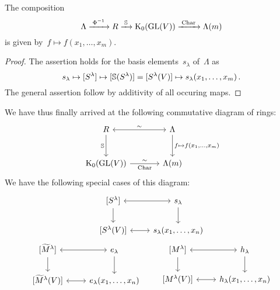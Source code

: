 \documentclass[a4paper,10pt]{scrartcl}
\begin{document}
\begin{corollary}
  The composition
  \[
    \Lambda
    \xrightarrow{\;\Phi^{-1}\;}
    R
    \xrightarrow{\;\mathbb{S}\;}
    \operatorname{K}_0(\operatorname{GL}(V))
    \xrightarrow{\;\operatorname{Char}\;}
    \Lambda(m)
  \]
  is given by~$f \mapsto f(x_1, \dotsc, x_m)$.
\end{corollary}

\begin{proof}
  The assertion holds for the basis elements~$s_\lambda$ of~$\Lambda$ as
  \[
    s_\lambda
    \mapsto
    [S^\lambda]
    \mapsto
    [\mathbb{S}(S^\lambda)]
    =
    [S^\lambda(V)]
    \mapsto
    s_\lambda(x_1, \dotsc, x_m) \,.
  \]
  The general assertion follow by additivity of all occuring maps.
\end{proof}

We have thus finally arrived at the following commutative diagram of rings:
\[
  \begin{tikzcd}[sep = large]
    R
    \arrow[leftrightarrow]{r}{\sim}
    \arrow{d}[left]{\Schur}
    &
    \Lambda
    \arrow{d}[right]{f \mapsto f(x_1, \dotsc, x_m)}
    \\
    \K_0(\GL(V))
    \arrow{r}[above]{\sim}[below]{\Char}
    &
    \Lambda(m)
  \end{tikzcd}
\]
We have the following special cases of this diagram:
\begin{gather*}
  \begin{tikzcd}[ampersand replacement = \&]
    {[S^\lambda]}
    \arrow[leftrightarrow]{r}
    \arrow{d}
    \&
    s_\lambda
    \arrow{d}
    \\
    {[S^\lambda(V)]}
    \arrow[leftrightarrow]{r}
    \&
    s_\lambda(x_1, \dotsc, x_n)
  \end{tikzcd}
  \\
  \begin{tikzcd}[ampersand replacement = \&]
    {[\widetilde{M}^\lambda]}
    \arrow[leftrightarrow]{r}
    \arrow{d}
    \&
    e_\lambda
    \arrow{d}
    \\
    {[\widetilde{M}^\lambda(V)]}
    \arrow[leftrightarrow]{r}
    \&
    e_\lambda(x_1, \dotsc, x_n)
  \end{tikzcd}
  \qquad
  \begin{tikzcd}[ampersand replacement = \&]
    {[M^\lambda]}
    \arrow[leftrightarrow]{r}
    \arrow{d}
    \&
    h_\lambda
    \arrow{d}
    \\
    {[M^\lambda(V)]}
    \arrow[leftrightarrow]{r}
    \&
    h_\lambda(x_1, \dotsc, x_n)
  \end{tikzcd}
\end{gather*}
\end{document}
